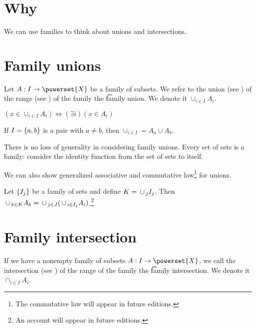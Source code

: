 

\section*{Why}

We can use families to think about unions and intersections.

\section*{Family unions}

Let $A: I \to \powerset{X}$ be a family of subsets.
We refer to the union (see ) of the range (see ) of the family the \t{family union}.
We denote it $\cup_{i \in I} A_i$.

\begin{proposition}
$(x \in \cup_{i \in I} A_i) \iff (\exists i)(x \in A_i)$\end{proposition}
If $I = \{a, b\}$ is a pair with $a \neq b$, then $\cup_{i \in I} = A_a \cup A_b$.

There is no loss of generality in considering family unions.
Every set of sets is a family: consider the identity function from the set of sets to itself.

We can also show generalized associative and commutative law\footnote{The commutative law will appear in future editions.}
for unions.

\begin{proposition}
Let $\{I_j\}$ be a family of sets and define $K = \,\cup\,_{j} I_j$. Then $\,\cup\,_{k \in K} A_k = \,\cup\,_{j \in J}(\,\cup\,_{i \in I_j} A_i)$.\footnote{An account will appear in future editions.}\end{proposition}
\section*{Family intersection}

If we have a nonempty family of subsets $A: I \to \powerset{X}$, we call the intersection (see ) of the range of the family the \t{family intersection}.
We denote it $\cap _{i \in I} A_i$.

